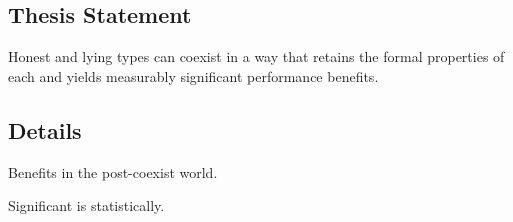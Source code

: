 

\subsection{Thesis Statement}

%
%
%

Honest and lying types can coexist in a way that retains the formal properties
 of each and yields measurably significant performance benefits.

\subsection{Details}

Benefits in the post-coexist world.

Significant is statistically.
